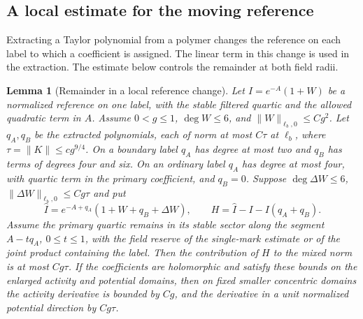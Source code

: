 \documentclass[11pt]{article}
\newtheorem{lemma}[theorem]{Lemma}
\theoremstyle{definition}
\begin{document}
\subsection{A local estimate for the moving reference}
\label{sec:cube-moving-reference}

Extracting a Taylor polynomial from a polymer changes the reference
on each label to which a coefficient is assigned. The linear term in
this change is used in the extraction. The estimate below controls the
remainder at both field radii.

\begin{lemma}[Remainder in a local reference change]
\label{lem:cube-reference-change}
Let \(I=e^{-A}(1+W)\) be a normalized reference on one label, with
the stable filtered quartic and the allowed quadratic term in \(A\).
Assume \(0<g\le1\), \(\deg W\le6\), and
\(\|W\|_{\ell_b,0}\le Cg^2\). Let \(q_A,q_B\) be the extracted
polynomials, each of norm at most \(C\tau\) at \(\ell_b\), where
\(\tau=\|K\|\le c g^{9/4}\). On a boundary label \(q_A\) has degree
at most two and \(q_B\) has terms of degrees four and six. On an
ordinary label \(q_A\) has degree at most four, with quartic term in
the primary coefficient, and \(q_B=0\).
Suppose \(\deg\Delta W\le6\), \(\|\Delta W\|_{\ell_b,0}\le Cg\tau\)
and put
\begin{equation}
 \widehat I=e^{-A+q_A}(1+W+q_B+\Delta W),\qquad
 H=\widehat I-I-I(q_A+q_B).
\end{equation}
Assume the primary quartic remains in its stable sector along the
segment \(A-tq_A\), \(0\le t\le1\), with the field reserve of the
single-mark estimate or of the joint product containing the label.
Then the contribution of \(H\) to the mixed norm is at most
\(Cg\tau\). If the coefficients are holomorphic and satisfy these
bounds on the enlarged activity and potential domains, then on
fixed smaller concentric domains the activity derivative is bounded
by \(Cg\), and the derivative in a unit normalized potential direction
by \(Cg\tau\).
\end{lemma}
\end{document}
